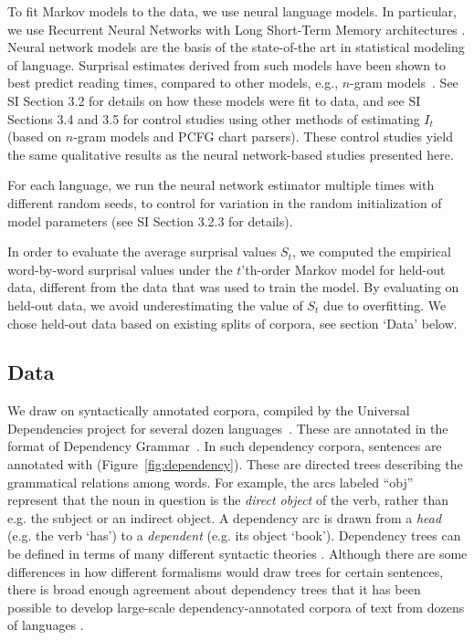 To fit Markov models to the data, we use neural language models. In particular, we use Recurrent Neural Networks with Long Short-Term Memory architectures \citep{hochreiter-long-1997}. 
Neural network models are the basis of the state-of-the art in statistical modeling of language. Surprisal estimates derived from such models have been shown to best predict reading times, compared to other models, e.g., $n$-gram models~\citep{frank-insensitivity-2011,goodkind-predictive-2018}.
See SI Section 3.2 for details on how these models were fit to data, and see SI Sections 3.4 and 3.5 for control studies using other methods of estimating $I_t$ (based on $n$-gram models and PCFG chart parsers). These control studies yield the same qualitative results as the neural network-based studies presented here.

For each language, we run the neural network estimator multiple times with different random seeds, to control for variation in the random initialization of model parameters (see SI Section 3.2.3 for details).

In order to evaluate the average surprisal values $S_t$, we computed the empirical word-by-word surprisal values under the $t$'th-order Markov model for held-out data, different from the data that was used to train the model. By evaluating on held-out data, we avoid underestimating the value of $S_t$ due to overfitting.
We chose held-out data based on existing splits of corpora, see section `Data' below.




\subsection{Data}\label{sec:exp2-data}
We draw on syntactically annotated corpora, compiled by the Universal Dependencies project for several dozen languages~\citep{nivre-universal-2017}.
These are annotated in the format of Dependency Grammar~\citep{hays1964dependency,hudson1984word,melcuk1988dependency,corbett1993heads,tesniere2015elements}.
In such dependency corpora, sentences are annotated with  (Figure~\ref{fig:dependency}).
These are directed trees describing the grammatical relations among words. For example, the arcs labeled ``obj'' represent that the noun in question is the \emph{direct object} of the verb, rather than e.g. the subject or an indirect object.
A dependency arc is drawn from a \emph{head} (e.g. the verb `has') to a \emph{dependent} (e.g. its object `book').
Dependency trees can be defined in terms of many different syntactic theories \citep{corbett1993heads}.
Although there are some differences in how different formalisms would draw trees for certain sentences, there is broad enough agreement about dependency trees that it has been possible to develop large-scale dependency-annotated corpora of text from dozens of languages \citep{nivre2017universal}.

